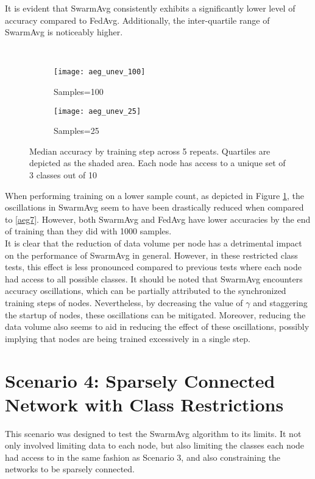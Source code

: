 It is evident that SwarmAvg consistently exhibits a significantly lower level of accuracy compared to FedAvg. Additionally, the inter-quartile range of SwarmAvg is noticeably higher.

\begin{figure}[H] 
	 \\
	\begin{subfigure}{0.49\textwidth}
		\texttt{[image: aeg\_unev\_100]}
		\caption{Samples=100}
	\end{subfigure}
	\begin{subfigure}{0.49\textwidth}
		\texttt{[image: aeg\_unev\_25]}
		\caption{Samples=25}
	\end{subfigure}
	\caption{Median accuracy by training step across 5 repeats. Quartiles are depicted as the shaded area. Each node has access to a unique set of 3 classes out of 10}
	\label{aeg8}
\end{figure}

When performing training on a lower sample count, as depicted in Figure \ref{aeg8}, the oscillations in SwarmAvg seem to have been drastically reduced when compared to \ref{aeg7}. However, both SwarmAvg and FedAvg have lower accuracies by the end of training than they did with 1000 samples. \\

It is clear that the reduction of data volume per node has a detrimental impact on the performance of SwarmAvg in general. However, in these restricted class tests, this effect is less pronounced compared to previous tests where each node had access to all possible classes. It should be noted that SwarmAvg encounters accuracy oscillations, which can be partially attributed to the synchronized training steps of nodes. Nevertheless, by decreasing the value of $\gamma$ and staggering the startup of nodes, these oscillations can be mitigated. Moreover, reducing the data volume also seems to aid in reducing the effect of these oscillations, possibly implying that nodes are being trained excessively in a single step.

\section{Scenario 4: Sparsely Connected Network with Class Restrictions}
This scenario was designed to test the SwarmAvg algorithm to its limits. It not only involved limiting data to each node, but also limiting the classes each node had access to in the same fashion as Scenario 3, and also constraining the networks to be sparsely connected.

